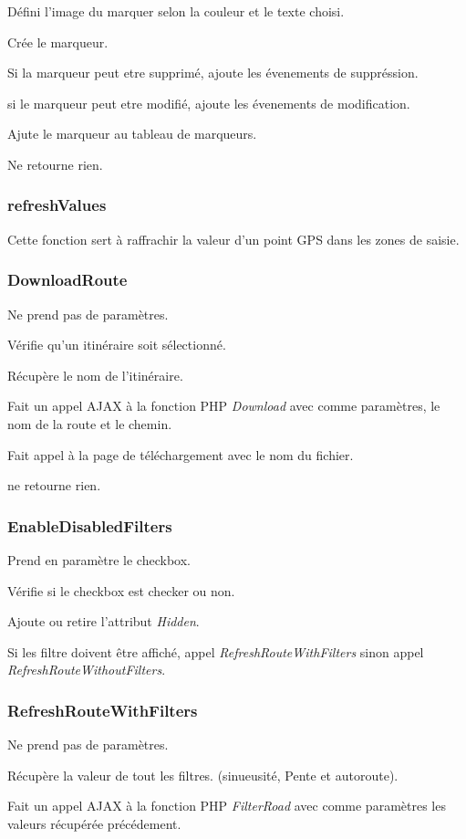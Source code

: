\documentclass[a4paper]{article}
\begin{document}
Défini l'image du marquer selon la couleur et le texte choisi.

Crée le marqueur.

Si la marqueur peut etre supprimé, ajoute les évenements de suppréssion.

si le marqueur peut etre modifié, ajoute les évenements de modification.

Ajute le marqueur au tableau de marqueurs.

Ne retourne rien.

\subsubsection{refreshValues}
Cette fonction sert à raffrachir la valeur d'un point GPS dans les zones de saisie.

\subsubsection{DownloadRoute}
Ne prend pas de paramètres.

Vérifie qu'un itinéraire soit sélectionné.

Récupère le nom de l'itinéraire.

Fait un appel AJAX à la fonction PHP \emph{Download} avec comme paramètres, le nom de la route et le chemin.

Fait appel à la page de téléchargement avec le nom du fichier.

ne retourne rien.

\subsubsection{EnableDisabledFilters}
Prend en paramètre le checkbox.

Vérifie si le checkbox est checker ou non.

Ajoute ou retire l'attribut \emph{Hidden}.

Si les filtre doivent être affiché, appel \emph{RefreshRouteWithFilters} sinon appel \emph{RefreshRouteWithoutFilters}.

\subsubsection{RefreshRouteWithFilters}
Ne prend pas de paramètres.

Récupère la valeur de tout les filtres. (sinueusité, Pente et autoroute).

Fait un appel AJAX à la fonction PHP \emph{FilterRoad} avec comme paramètres les valeurs récupérée précédement.
\end{document}
